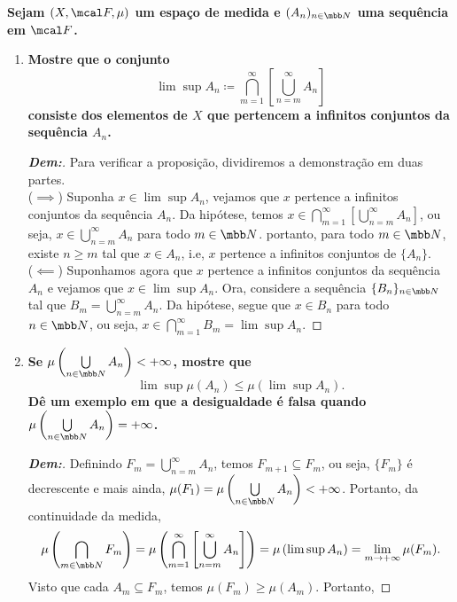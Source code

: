 \biglinend
\newpage 
{}
\myexe{\thedois}
\bigline 
\textbf{Sejam $(X, \mcal F, \mu)$ um espaço de medida e $(A_n)_{n \in \mbb N}$
uma sequência em $\mcal F$.}
\begin{enumerate}[label=(\alph*), wide, labelindent=0pt]
  \item \textbf{Mostre que o conjunto 
    $$\lim \sup A_n \coloneq \bigcap_{m=1}^\infty\left
    [\bigcup\limits_{n = m}^\infty A_n\right]$$ 
    consiste dos elementos de $X$ que pertencem a infinitos conjuntos da sequência $A_n$.}
    \begin{proof}[\textbf{Dem:}] Para verificar a proposição, dividiremos a demonstração 
      em duas partes. \\
      ($\implies$) Suponha $x \in \lim\sup A_n$, vejamos que $x$ pertence a infinitos 
      conjuntos da sequência $A_n$. Da hipótese, temos $x \in \bigcap_{m=1}^\infty 
      \left[\bigcup_{n = m}^\infty A_n\right]$, ou seja, $x \in \bigcup_{n=m}^\infty A_n$
      para todo $m \in \mbb N$. portanto, para todo $m \in \mbb N$, existe $n \ge m$ tal que 
      $x \in A_n$, i.e, $x$ pertence a infinitos conjuntos de $\{A_n\}$.\\
      ($\impliedby$) Suponhamos agora que $x$ pertence a infinitos conjuntos da sequência 
      $A_n$ e vejamos que $x \in \lim\sup A_n$. Ora, considere a sequência 
      $\{B_n\}_{n \in \mbb N}$ tal que $B_m = \bigcup_{n=m}^\infty A_n$. Da hipótese, 
      segue que $x \in B_n$ para todo $n \in \mbb N$, ou seja, 
      $x \in \bigcap\limits_{m=1}^\infty B_m = \lim\sup A_n$. 
    \end{proof}
  \item \textbf{Se $\mu\left(\bigcup\limits_{n \in \mbb N} A_n\right) < +\infty$, mostre que 
    $$\lim \sup \mu (A_n) \le \mu(\lim\sup A_n).$$
  Dê um exemplo em que a desigualdade é falsa quando $\mu\left(\bigcup
    \limits_{n \in \mbb N} A_n\right) = +\infty$.}
    \begin{proof}[\textbf{Dem:}] Definindo $F_m = \bigcup\limits_{n = m}^\infty A_n$, temos 
      $F_{m + 1} \subseteq F_{m}$, ou seja, $\{F_m\}$ é decrescente e mais ainda, 
        $\mu(F_1) = \mu\left(\bigcup\limits_{n \in \mbb N} A_n\right) < +\infty$. 
        Portanto, da continuidade da medida, 
        $$\mu\left(\bigcap_{m \in \mbb N} F_m\right) =
        \mu\left(\bigcap_{m=1}^\infty\left[\bigcup\limits_{n = m}^\infty A_n\right]\right)
        = \mu\left(\lim\sup A_n\right) = \lim_{m \rightarrow +\infty} \mu(F_m).$$
      Visto que cada $A_m \subseteq F_m$, temos $\mu(F_m) \ge \mu(A_m)$. Portanto, 

\end{proof}
\end{enumerate}
